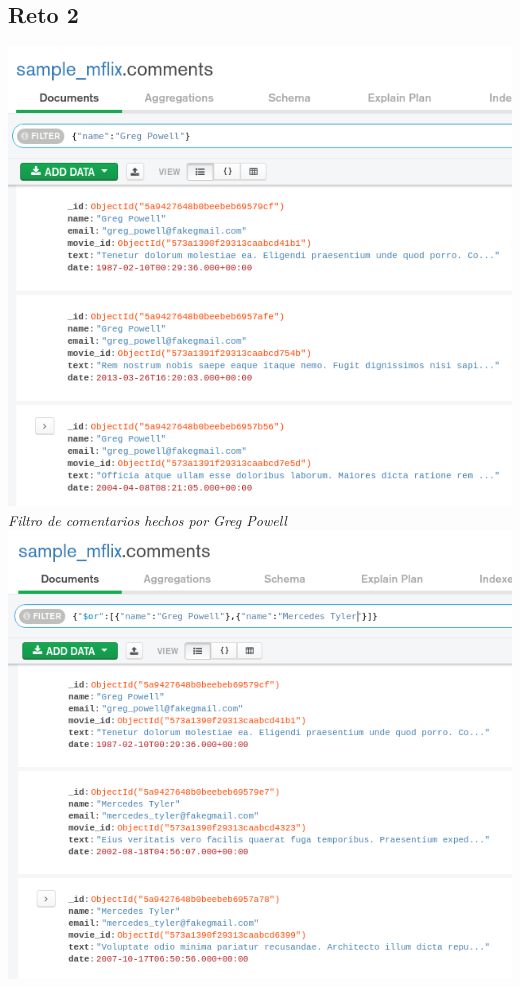 \documentclass[10pt]{article}
\begin{document}
\subsection{Reto 2}
\begin{center}
  \includegraphics[scale=0.35]{imgs/e2_1.png}\\
  \textit{Filtro de comentarios hechos por Greg Powell}\\
  \includegraphics[scale=0.35]{imgs/e2_2.png}\\

\end{center}
\end{document}
